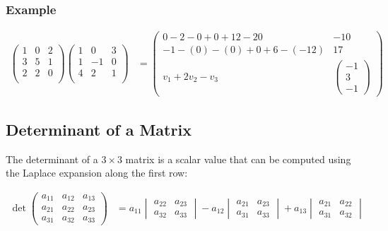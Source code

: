 \documentclass{article}
\begin{document}
\subsubsection*{Example}
\begin{align*}
    \begin{pmatrix}
        1 & 0 & 2 \\
        3 & 5 & 1 \\
        2 & 2 & 0 \\
    \end{pmatrix}
    \begin{pmatrix}
        1 & 0  & 3 \\
        1 & -1 & 0 \\
        4 & 2  & 1 \\
    \end{pmatrix}
     & =
    \begin{pmatrix}
        0 - 2 - 0 + 0 + 12 - 20     & -10                                         \\
        -1 -(0) -(0) + 0 + 6 -(-12) & 17                                          \\
        v_1 + 2v_2 - v_3            & \begin{pmatrix} -1 \\ 3 \\ -1 \end{pmatrix}
    \end{pmatrix}
\end{align*}

\subsection{Determinant of a Matrix}

The determinant of a $3 \times 3$ matrix is a scalar value that can be computed using the Laplace expansion along the first row:

\begin{align*}
    \det \begin{pmatrix}
             a_{11} & a_{12} & a_{13} \\
             a_{21} & a_{22} & a_{23} \\
             a_{31} & a_{32} & a_{33}
         \end{pmatrix}
     & = a_{11} \begin{vmatrix}
                    a_{22} & a_{23} \\
                    a_{32} & a_{33}
                \end{vmatrix}
    - a_{12} \begin{vmatrix}
                 a_{21} & a_{23} \\
                 a_{31} & a_{33}
             \end{vmatrix}
    + a_{13} \begin{vmatrix}
                 a_{21} & a_{22} \\
                 a_{31} & a_{32}
             \end{vmatrix}
\end{align*}
\end{document}
